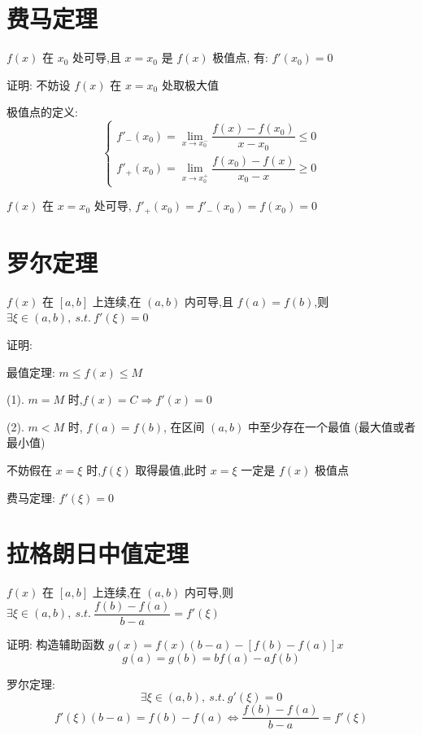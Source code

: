 \section{费马定理}
\begin{theorem}[费马定理]

	$f(x)$ 在 $x_{0}$ 处可导,且 $x=x_{0}$ 是 $f(x)$ 极值点, 有: $f'(x_{0})=0$

	证明: 不妨设 $f(x)$ 在 $x=x_{0}$ 处取极大值

	极值点的定义:
	$$\begin{cases}
		f'_{-}(x_{0})=\lim\limits_{x\to x_{0}^{-}}\dfrac{f(x)-f(x_{0})}{x-x_{0}}\leq 0 \\
		f'_{+}(x_{0})=\lim\limits_{x\to x_{0}^{+}}\dfrac{f(x_{0})-f(x)}{x_{0}-x}\geq 0
	\end{cases}$$

	$f(x)$ 在 $x=x_{0}$ 处可导, $f'_{+}(x_{0})=f'_{-}(x_{0})=f(x_{0})=0$
\end{theorem}
\section{罗尔定理}
\begin{theorem}[罗尔定理]

	$f(x)$ 在 $[a,b]$ 上连续,在 $(a,b)$ 内可导,且 $f(a)=f(b)$,则 $\exists \xi\in(a,b),\ s.t.\ f'(\xi)=0$

	证明: 
	
	最值定理: $m\leq f(x)\leq M$

	(1). $m=M$ 时,$f(x) = C \Rightarrow f'(x)=0$

	(2). $m<M$ 时, $f(a)=f(b)$, 在区间 $(a,b)$ 中至少存在一个最值 (最大值或者最小值)

	不妨假在 $x=\xi$ 时,$f(\xi)$ 取得最值,此时 $x=\xi$ 一定是 $f(x)$ 极值点
	
	费马定理: $f'(\xi)=0$

\end{theorem}
\section{拉格朗日中值定理}
\begin{theorem}[拉格朗日中值定理]

	$f(x)$ 在 $[a,b]$ 上连续,在 $(a,b)$ 内可导,则 $\exists \xi\in(a,b),\ s.t.\ \dfrac{f(b)-f(a)}{b-a}=f'(\xi)$

	证明: 构造辅助函数 $g(x)=f(x)(b-a)-[f(b)-f(a)]x$
	$$g(a)=g(b)=bf(a)-af(b)$$

	罗尔定理:
	$$\exists \xi\in(a,b),\ s.t.\ g'(\xi)=0$$
	$$ f'(\xi)(b-a)=f(b)-f(a)\Leftrightarrow  \frac{f(b)-f(a)}{b-a}=f'(\xi)$$
\end{theorem}
